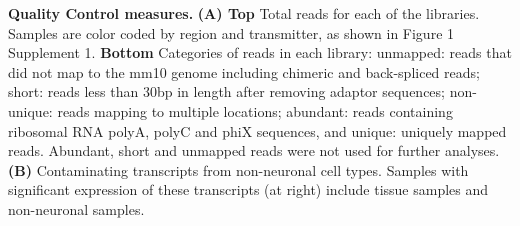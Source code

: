 \textbf{Quality Control measures.} \textbf{(A) Top} Total reads for each of the libraries. Samples are color coded by region and transmitter, as shown in Figure 1 Supplement 1.
\textbf {Bottom} Categories of reads in each library: unmapped: reads that did not map to the mm10 genome including chimeric and back-spliced reads; short: reads less than 30bp in length after removing adaptor sequences; non-unique: reads mapping to multiple locations; abundant: reads containing ribosomal RNA polyA, polyC and phiX sequences, and unique: uniquely mapped reads. Abundant, short and unmapped reads were not used for further analyses.
\textbf{(B)} Contaminating transcripts from non-neuronal cell types. Samples with significant expression of these transcripts (at right) include tissue samples and non-neuronal samples. 
